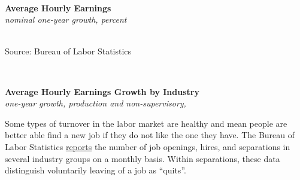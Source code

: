 \documentclass{report}
\makeatletter
\newcommand{\tbllink}[1]{\href{https://raw.githubusercontent.com/bdecon/US-chartbook/master/chartbook/data/#1}{\faTable}}
\newcommand*\short[1]{\expandafter\@gobbletwo\number\numexpr#1\relax}
\newcommand{\dateaxisticks}{
		date coordinates in=x, axis line style={draw=none},
		xmax={2020-02-01},
		max space between ticks=40,	    
		xtick={{1990-01-01}, {1992-01-01}, {1994-01-01}, 
			{1996-01-01}, {1998-01-01}, {2000-01-01}, 
			{2002-01-01}, {2004-01-01}, {2006-01-01},
			{2008-01-01}, {2010-01-01}, {2012-01-01}, {2014-01-01},
		    {2016-01-01}, {2018-01-01}, {2020-01-01}},
		minor xtick={{1989-01-01}, {1991-01-01}, {1993-01-01},
			{1995-01-01}, {1997-01-01}, {1999-01-01}, 
			{2001-01-01}, {2003-01-01}, {2005-01-01}, {2007-01-01},
		    {2009-01-01}, {2011-01-01}, {2013-01-01}, {2015-01-01},
		    {2017-01-01}, {2019-01-01}},
		enlarge y limits={0.06}, enlarge x limits={0.01},
		}
\newcommand{\bbar}[2]{extra #1 ticks = {{#2}}, extra #1 tick labels = ,
		extra #1 tick style = {grid=major, grid style={thick, black!25}},}
\newcommand{\stdline}[4]{\addplot[very thick, no markers, color=#1] 
		table [x=#2, y=#3, col sep=comma] {#4};	}
\newcommand{\thickline}[4]{\addplot[ultra thick, no markers, color=#1] 
		table [x=#2, y=#3, col sep=comma] {#4};	}
\newcommand{\rbars}{
		\fill[color=black!10] (axis cs:{1990-07-01},\pgfkeysvalueof{/pgfplots/ymin}) rectangle 
			(axis cs:{1991-03-01}, \pgfkeysvalueof{/pgfplots/ymax});
		\fill[color=black!10] (axis cs:{2007-12-01},\pgfkeysvalueof{/pgfplots/ymin}) rectangle 
			(axis cs:{2009-07-01}, \pgfkeysvalueof{/pgfplots/ymax});
		\fill[color=black!10] (axis cs:{2001-03-01},\pgfkeysvalueof{/pgfplots/ymin}) rectangle 
			(axis cs:{2001-11-01}, \pgfkeysvalueof{/pgfplots/ymax});}
\makeatother
\begin{document}
{{{{\begin{minipage}{0.76\textwidth}
\end{minipage}

\newpage

\begin{minipage}{0.76\textwidth}

\small \\

\vspace{2mm}

\noindent \normalsize \textbf{Average Hourly Earnings}\\
\footnotesize{\textit{nominal one-year growth, percent}}\\ 
\noindent \hspace*{-2mm} \\
\footnotesize{Source: Bureau of Labor Statistics} \hfill \tbllink{ahe.csv}\\

\vspace{3mm}

\small  \\

\vspace{2mm}

\noindent \normalsize \textbf{Average Hourly Earnings Growth by Industry}\\
\footnotesize{\textit{one-year growth, production and non-supervisory, }}\\ 



\end{minipage}

\newpage

\begin{minipage}{0.76\textwidth}


\small Some types of turnover in the labor market are healthy and mean people are better able find a new job if they do not like the one they have. The Bureau of Labor Statistics \href{https://www.bls.gov/news.release/pdf/jolts.pdf}{reports} the number of job openings, hires, and separations in several industry groups on a monthly basis. Within separations, these data distinguish voluntarily leaving of a job as ``quits''. 
\end{minipage}\\

}}}}
\end{document}
